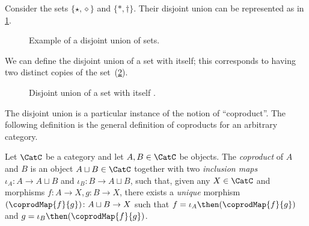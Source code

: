 \begin{example}
Consider the sets $\{\star, \diamond\}$ and $\{\ast, \dagger\}$. Their disjoint union can be represented as in \cref{fig:disjoint}.
\begin{figure}[h!]
    \begin{center}
    \end{center}
    \caption{Example of a disjoint union of sets. \label{fig:disjoint}}
\end{figure}
\end{example}

We can define the disjoint union of a set with itself; this corresponds to having two distinct copies of the set~(\cref{fig:disjointself}).

\begin{figure}[h!]
\begin{center}
    \caption{Disjoint union of a set with itself \label{fig:disjointself}.}
\end{center}
\end{figure}

The disjoint union is a particular instance of the notion of ``coproduct''.
The following definition is the general definition of coproducts for an arbitrary category.

\begin{shaded}
\begin{definition}[Coproduct]
Let $\CatC$ be a category and let $A, B \in \CatC$ be objects. The \emph{coproduct} of $A$ and $B$ is an object $A \sqcup B \in \CatC$ together with two \emph{inclusion maps} $\iota_A \colon A \to A \sqcup B $ and $\iota_B \colon B \to A  \sqcup B $, such that, given any $X \in \CatC$ and morphisms $f\colon  A \to X, g \colon B \to X$, there exists a \emph{unique} morphism $(\coprodMap{f}{g}) \colon A \sqcup B \to X$ such that $f = \iota_A\then (\coprodMap{f}{g})$ and $g = \iota_B \then (\coprodMap{f}{g})$.
\end{definition}
\end{shaded}

